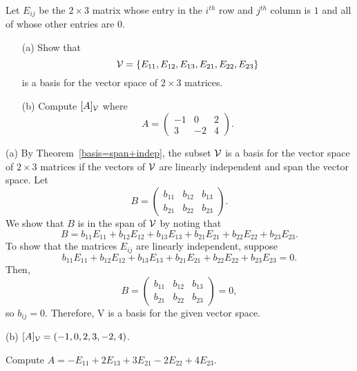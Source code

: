 \documentclass{ximera}
\begin{document}
\begin{exercise} \label{c7.1.3}
Let $E_{ij}$ be the $2\times 3$ matrix whose entry in the
$i^{th}$ row and $j^{th}$ column is $1$ and all of whose
other entries are $0$.
\begin{itemize}
\item[(a)]  Show that
\[
{\cal V}=\{E_{11},E_{12},E_{13},E_{21},E_{22},E_{23}\}
\]
is a basis for the vector space of $2\times 3$ matrices.
\item[(b)]   Compute $[A]_{\cal V}$ where
\[
A=\left(\begin{array}{rrr} -1 & 0 & 2\\ 3 & -2 & 4\end{array}\right).
\]
\end{itemize}

\begin{solution}

\soln
(a) By Theorem~\ref{basis=span+indep},
the subset ${\cal V}$ is a basis for the vector space of $2 \times
3$ matrices if the vectors of ${\cal V}$ are linearly independent and
span the vector space.  Let
\[ 
B = \left(\begin{array}{rrr} b_{11} & b_{12} & b_{13} \\ b_{21} &
b_{22} & b_{23} \end{array}\right). 
\]
We show that $B$ is in the span of ${\cal V}$ by noting that
\[
B = b_{11}E_{11} + b_{12}E_{12} + b_{13}E_{13} + b_{21}E_{21}
+ b_{22}E_{22} + b_{23}E_{23}.  
\]
To show that the matrices $E_{ij}$
are linearly independent, suppose 
\[
b_{11}E_{11} + b_{12}E_{12} + b_{13}E_{13} + b_{21}E_{21} + b_{22}E_{22} + b_{23}E_{23} = 0.  
\]
Then,
\[  B = \left(\begin{array}{rrr} b_{11} & b_{12} & b_{13} \\ b_{21} &
b_{22} & b_{23} \end{array}\right) = 0, \]
so $b_{ij} = 0$.
Therefore, {\cal V} is a basis for the given vector space.

(b) \ans $[A]_{\cal V} = (-1,0,2,3,-2,4)$.

\soln Compute $A = -E_{11} + 2E_{13} + 3E_{21} - 2E_{22} + 4E_{23}$.

\end{solution}
\end{exercise}
\end{document}
